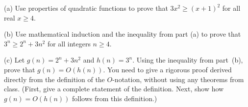 \documentclass[11pt]{article}
\begin{document}
\begin{problem}
	
\smallskip
\noindent
(a) Use properties of quadratic functions to prove that $3x^2 \geq (x + 1)^
2$ for all real $x \ge 4$.

\smallskip
\noindent
(b) Use mathematical induction and the inequality from part (a) to prove that $3^n \ge 2^{n} + 3n^2$ for all integers $n\ge 4$.

\smallskip
\noindent
(c)
Let $g(n) =  2^{n} + 3n^2$ and $h(n) = 3^n$.
Using the inequality from part~(b), prove that $g(n) = O(h(n))$.
You need to give a rigorous proof derived directly from 
the definition of the $O$-notation, without using any theorems from class.
(First, give a complete statement of the definition. 
Next, show how $g(n) = O(h(n)) $ follows from this definition.)

\end{problem}
\end{document}

